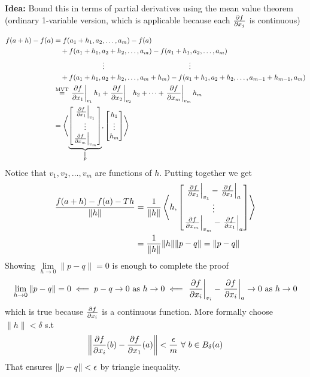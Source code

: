 \begin{myproof}
\textbf{Idea:} Bound this in terms of partial derivatives using the mean value theorem (ordinary 1-variable version, which is applicable because each $\frac{\partial f}{\partial x_j}$ is continuous)

\begin{align*}
	f(a+h)-f(a) & = f(a_1+h_1,a_2,\dots, a_m) - f(a)\\
	&\quad + f(a_1+h_1,a_2+h_2,\dots, a_m) - f(a_1+h_1,a_2,\dots, a_m)\\
	&\quad \qquad\qquad\qquad \vdots\qquad\qquad\qquad\qquad\qquad\qquad \vdots\\
	&\quad + f(a_1+h_1,a_2+h_2,\dots, a_m+h_m) - f(a_1+h_1,a_2+h_2,\dots,a_{m-1}+h_{m-1}, a_m)\\
	& \overset{\text{MVT}}{=} \left.\frac{\partial f}{\partial x_1}\right|_{v_1}h_1+\left.\frac{\partial f}{\partial x_2}\right|_{v_2}h_2+\cdots + \left.\frac{\partial f}{\partial x_m}\right|_{v_m}h_m\\
	& =\left\langle \underbrace{\left[\begin{matrix}
		\left.\frac{\partial f}{\partial x_1}\right|_{v_1} \\ \vdots \\ \left.\frac{\partial f}{\partial x_m}\right|_{v_m}
	\end{matrix} \right]}_{\substack{\parallel \\ p}}, \left[ \begin{matrix}
		h_1 \\ \vdots \\ h_m
	\end{matrix} \right] \right\rangle 
\end{align*}Notice that $v_1,v_2,\dots,v_m$ are functions of $h$. Putting together we get
\begin{align*}
	\dfrac{f(a+h)-f(a)-Th}{\|h\|} & = \frac1{\|h\|} \left\langle h,\left[ \begin{matrix}
		\left.\frac{\partial f}{\partial x_1}\right|_{v_1} -	\left.\frac{\partial f}{\partial x_1}\right|_a \\
		\vdots                                              \\
		\left.\frac{\partial f}{\partial x_m}\right|_{v_m}-	\left.\frac{\partial f}{\partial x_1}\right|_a
	\end{matrix} \right]  \right\rangle\\
& =\frac1{\|h\|}\|h\|\|p-q\|=\|p-q\|
\end{align*}
Showing $\lim\limits_{h\to 0}\|p-q\|=0$ is enough to complete the proof $$ \lim\limits_{h\to 0}\|p-q\|=0\impliedby  p-q\to 0 \text{ as }h\to 0 \impliedby \left.\frac{\partial f}{\partial x_i}\right|_{v_i} -	\left.\frac{\partial f}{\partial x_i}\right|_a  \to 0\text{ as }h\to 0 $$ which is true because $\frac{\partial f}{\partial x_i}$ is a continuous function. More formally choose $\|h\|<\delta$ s.t $$\left\|\frac{\partial f}{\partial x_i}(b)-	\frac{\partial f}{\partial x_1}(a)\right\| <\frac{\epsilon}{m}\ \forall \ b\in B_{\delta}(a)$$That ensures $\|p-q\|<\epsilon$ by triangle inequality.

\end{myproof}